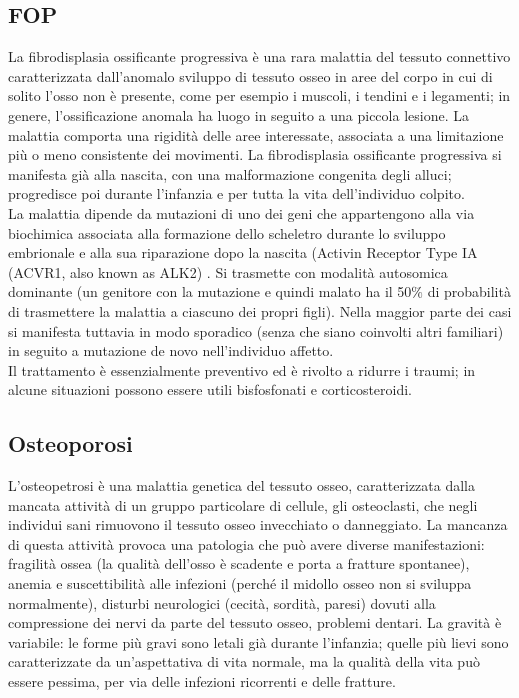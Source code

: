 \documentclass{article}
\begin{document}
\subsection{FOP} La fibrodisplasia ossificante progressiva è una rara malattia del tessuto
connettivo caratterizzata dall'anomalo sviluppo di tessuto osseo in aree del
corpo in cui di solito l'osso non è presente, come per esempio i muscoli, i
tendini e i legamenti; in genere, l'ossificazione anomala ha luogo in seguito a
una piccola lesione. La malattia comporta una rigidità delle aree interessate,
associata a una limitazione più o meno consistente dei movimenti. La
fibrodisplasia ossificante progressiva si manifesta già alla nascita, con una
malformazione congenita degli alluci; progredisce poi durante l'infanzia e
per tutta la vita dell'individuo colpito.\\
La malattia dipende da mutazioni di uno dei geni che appartengono alla via biochimica
associata alla formazione dello scheletro durante lo sviluppo embrionale e alla sua
riparazione dopo la nascita (Activin Receptor Type IA (ACVR1, also known as ALK2) . Si trasmette
con modalità autosomica dominante (un genitore con la mutazione e quindi malato ha il
50$\%$ di probabilità di trasmettere la malattia a ciascuno dei propri figli). Nella maggior parte
dei casi si manifesta tuttavia in modo sporadico (senza che siano coinvolti altri familiari) in
seguito a mutazione de novo nell'individuo affetto.\\
Il trattamento è essenzialmente preventivo ed è rivolto a ridurre i traumi; in alcune situazioni
possono essere utili bisfosfonati e corticosteroidi.
\subsection{Osteoporosi}L'osteopetrosi è una malattia genetica del tessuto osseo, caratterizzata dalla mancata
attività di un gruppo particolare di cellule, gli osteoclasti, che negli individui sani rimuovono
il tessuto osseo invecchiato o danneggiato. La mancanza di questa attività provoca una
patologia che può avere diverse manifestazioni: fragilità ossea (la qualità dell'osso è
scadente e porta a fratture spontanee), anemia e suscettibilità alle infezioni (perché il
midollo osseo non si sviluppa normalmente), disturbi neurologici (cecità, sordità, paresi)
dovuti alla compressione dei nervi da parte del tessuto osseo, problemi dentari. La gravità è
variabile: le forme più gravi sono letali già durante l'infanzia; quelle più lievi sono
caratterizzate da un'aspettativa di vita normale, ma la qualità della vita può essere pessima,
per via delle infezioni ricorrenti e delle fratture.
\end{document}
